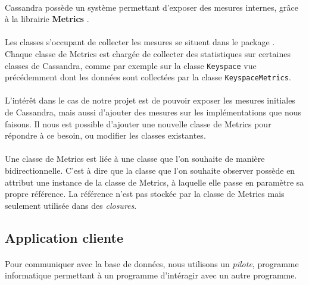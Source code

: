 \documentclass[12pt]{article}
\newcommand{\class}[1]{\texttt{#1}}
\begin{document}
\paragraph{} Cassandra possède un système permettant d'exposer des mesures internes, grâce à la librairie \textbf{Metrics} \cite{Metrics2010}.

\paragraph{} Les classes s'occupant de collecter les mesures se situent dans le package . Chaque classe de Metrics est chargée de collecter des statistiques sur certaines classes de Cassandra, comme par exemple sur la classe \class{Keyspace} vue précédemment dont les données sont collectées par la classe \class{KeyspaceMetrics}.

\paragraph{} L'intérêt dans le cas de notre projet est de pouvoir exposer les mesures initiales de Cassandra, mais aussi d'ajouter des mesures sur les implémentations que nous faisons. Il nous est possible d'ajouter une nouvelle classe de Metrics pour répondre à ce besoin, ou modifier les classes existantes.

\paragraph{} Une classe de Metrics est liée à une classe que l'on souhaite de manière bidirectionnelle. C'est à dire que la classe que l'on souhaite observer possède en attribut une instance de la classe de Metrics, à laquelle elle passe en paramètre sa propre référence. La référence n'est pas stockée par la classe de Metrics mais seulement utilisée dans des \textit{closures}.


\subsection{Application cliente}

\paragraph{} Pour communiquer avec la base de données, nous utilisons un \textit{pilote}, programme informatique permettant à un programme d'intéragir avec un autre programme.
\end{document}
